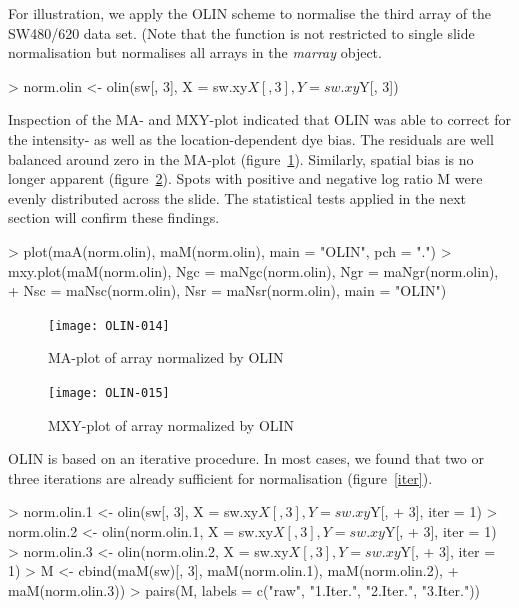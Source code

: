 \documentclass[a4paper,11pt]{article}
\begin{document}
For illustration, we apply the OLIN scheme to normalise the third array of the SW480/620 data set. 
(Note that the function is not restricted to single slide normalisation but normalises all arrays
in the \emph{marray} object.

\begin{Schunk}
\begin{Sinput}
> norm.olin <- olin(sw[, 3], X = sw.xy$X[, 3], Y = sw.xy$Y[, 3])
\end{Sinput}
\end{Schunk}

Inspection of the MA- and MXY-plot indicated that OLIN  was able to correct for the  
intensity- as well as  the  location-dependent dye bias. The
 residuals are well  balanced around zero in the MA-plot (figure~\ref{maolin}).
Similarly, spatial bias is no longer apparent (figure~\ref{mxyolin}).
Spots with positive and negative log ratio M were evenly distributed across the slide. 
The statistical tests
applied in the next section will confirm  these findings. 

\begin{Schunk}
\begin{Sinput}
> plot(maA(norm.olin), maM(norm.olin), main = "OLIN", pch = ".")
> mxy.plot(maM(norm.olin), Ngc = maNgc(norm.olin), Ngr = maNgr(norm.olin), 
+     Nsc = maNsc(norm.olin), Nsr = maNsr(norm.olin), main = "OLIN")
\end{Sinput}
\end{Schunk}



\begin{figure}[t]
\centering
\texttt{[image: OLIN-014]}
\caption{MA-plot of array normalized by  OLIN }
\label{maolin}
\end{figure}



\begin{figure}
\centering
\texttt{[image: OLIN-015]}
\caption{MXY-plot of array normalized by  OLIN }
\label{mxyolin}
\end{figure}


OLIN is based on an iterative procedure. In most cases, we found
that two or three iterations are already sufficient for normalisation (figure~\ref{iter}).   


\begin{Schunk}
\begin{Sinput}
> norm.olin.1 <- olin(sw[, 3], X = sw.xy$X[, 3], Y = sw.xy$Y[, 
+     3], iter = 1)
> norm.olin.2 <- olin(norm.olin.1, X = sw.xy$X[, 3], Y = sw.xy$Y[, 
+     3], iter = 1)
> norm.olin.3 <- olin(norm.olin.2, X = sw.xy$X[, 3], Y = sw.xy$Y[, 
+     3], iter = 1)
> M <- cbind(maM(sw)[, 3], maM(norm.olin.1), maM(norm.olin.2), 
+     maM(norm.olin.3))
> pairs(M, labels = c("raw", "1.Iter.", "2.Iter.", "3.Iter."))
\end{Sinput}
\end{Schunk}
\end{document}
